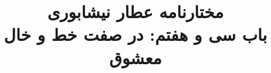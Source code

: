 \documentclass[14pt,b5paper]{article}
\begin{document}
\title{\Huge مختارنامه عطار نیشابوری \\
باب سی و هفتم: در صفت خط و خال معشوق}
\author{ }
\date{ }
\maketitle
\newpage
\tableofcontents
\newpage

\newpage

\newpage

\newpage

\newpage

\newpage

\newpage

\newpage

\newpage

\newpage

\newpage

\newpage

\newpage

\newpage

\newpage

\newpage

\newpage

\newpage

\newpage

\newpage

\newpage

\newpage
\end{document}
